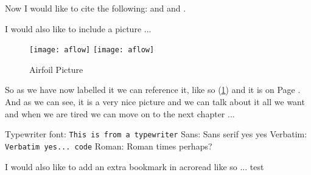 Now I would like to cite the following: \cite{latex} and \cite{texbook}
and \cite{Rud73}.

I would also like to include a picture ...

\begin{figure}[!htbp]
  \begin{center}
    \leavevmode
    \ifpdf
      \texttt{[image: aflow]}
    \else
      \texttt{[image: aflow]}
    \fi
    \caption{Airfoil Picture}
    \label{FigAir}
  \end{center}
\end{figure}


So as we have now labelled it we can reference it, like so (\ref{FigAir}) and it
is on Page \pageref{FigAir}. And as we can see, it is a very nice picture and we
can talk about it all we want and when we are tired we can move on to the next
chapter ...

Typewriter font: \texttt{This is from a typewriter}
Sans: \textsf{Sans serif yes yes}
Verbatim: \verb"Verbatim yes... code"
Roman: \textrm{Roman times perhaps?}

I would also like to add an extra bookmark in acroread like so ...
\ifpdf
test
\fi


